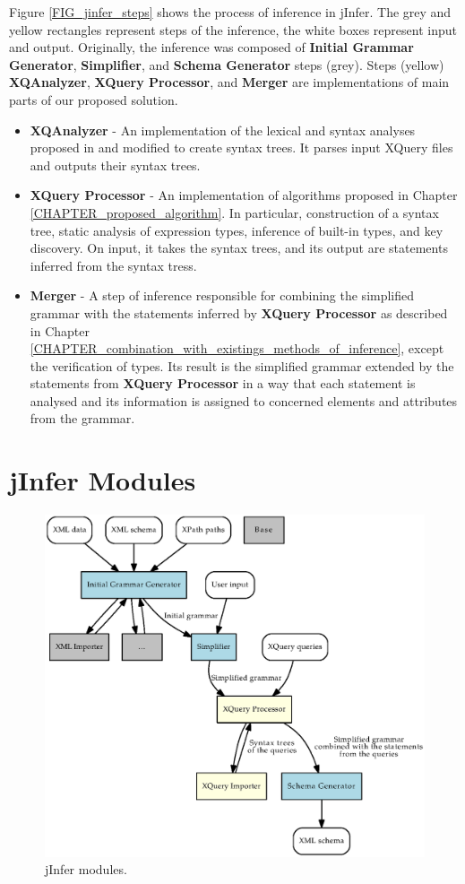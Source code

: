 Figure \ref{FIG_jinfer_steps} shows the process of inference in jInfer. The grey and yellow rectangles represent steps of the inference, the white boxes represent input and output. Originally, the inference was composed of \textbf{Initial Grammar Generator}, \textbf{Simplifier}, and \textbf{Schema Generator} steps (grey). Steps (yellow) \textbf{XQAnalyzer}, \textbf{XQuery Processor}, and \textbf{Merger} are implementations of main parts of our proposed solution.

\begin{itemize}
\item \textbf{XQAnalyzer} - An implementation of the lexical and syntax analyses proposed in \cite{thesis_schejbal} and modified to create syntax trees. It parses input XQuery files and outputs their syntax trees.
\item \textbf{XQuery Processor} - An implementation of algorithms proposed in Chapter \ref{CHAPTER_proposed_algorithm}. In particular, construction of a syntax tree, static analysis of expression types, inference of built-in types, and key discovery. On input, it takes the syntax trees, and its output are statements inferred from the syntax tress. 
\item \textbf{Merger} - A step of inference responsible for combining the simplified grammar with the statements inferred by \textbf{XQuery Processor} as described in Chapter \ref{CHAPTER_combination_with_existings_methods_of_inference}, except the verification of types. Its result is the simplified grammar extended by the statements from \textbf{XQuery Processor} in a way that each statement is analysed and its information is assigned to concerned elements and attributes from the grammar. 
\end{itemize}

\section{jInfer Modules}
\begin{figure}
\label{FIG_jinfer_modules}
\caption{jInfer modules.}
\includegraphics[scale=0.8]{jinfer_modules.eps}
\end{figure}

